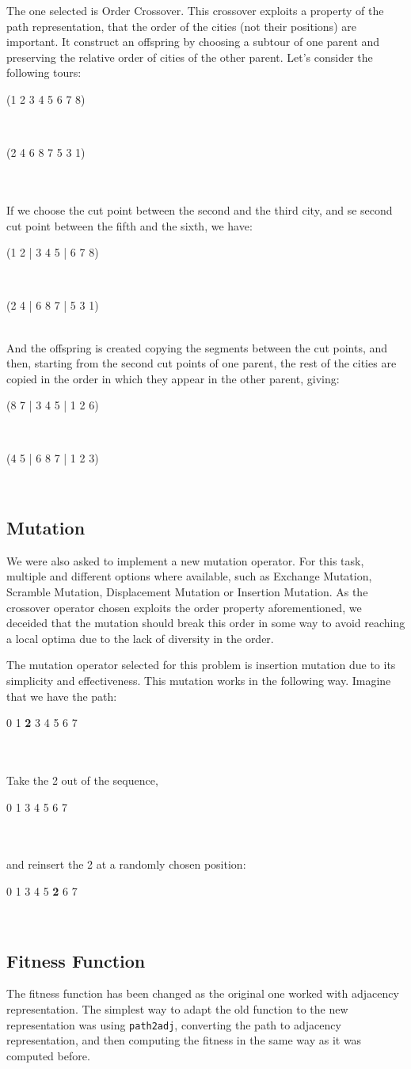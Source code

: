   The one selected is Order Crossover. This crossover exploits a property of the path representation, that the order of the cities (not their positions) are important. It construct an offspring by choosing a subtour of one parent and preserving the relative order of cities of the other parent.
  Let's consider the following tours:
  \\
\centerline{(1 2 3 4 5 6 7 8)}\\
\centerline{(2 4 6 8 7 5 3 1)}\\
\\
If we choose the cut point between the second and the third city, and se second cut point between the fifth and the sixth, we have:\\
\centerline{(1 2 | 3 4 5 | 6 7 8)}\\
\centerline{(2 4 | 6 8 7 | 5 3 1)}\\

And the offspring is created copying the segments between the cut points, and then, starting from the second cut points of one parent, the rest of the cities are copied in the order in which they appear in the other parent, giving: \\
\centerline{(8 7 | 3 4 5 | 1 2 6)}\\
\centerline{(4 5 | 6 8 7 | 1 2 3)}\\

\subsection{Mutation}
We were also asked to implement a new mutation operator. For this task, multiple and different options where available, such as Exchange Mutation, Scramble Mutation, Displacement Mutation or Insertion Mutation.
As the crossover operator chosen exploits the order property aforementioned, we deceided that the mutation should break this order in some way to avoid reaching a local optima due to the lack of diversity in the order.

The mutation operator selected for this problem is insertion mutation due to its simplicity and effectiveness. This mutation works in the following way. Imagine that we have the path:
\\
\centerline{0 1 \textbf{2} 3 4 5 6 7}\\
\\
Take the 2 out of the sequence,
\\
\centerline{0 1 3 4 5 6 7}\\
\\
and reinsert the 2 at a randomly chosen position:
\\
\centerline{0 1 3 4 5 \textbf{2} 6 7}\\


\subsection{Fitness Function}
The fitness function has been changed as the original one worked with adjacency representation. The simplest way to adapt the old function to the new representation was using \texttt{path2adj}, converting the path to adjacency representation, and then computing the fitness in the same way as it was computed before.